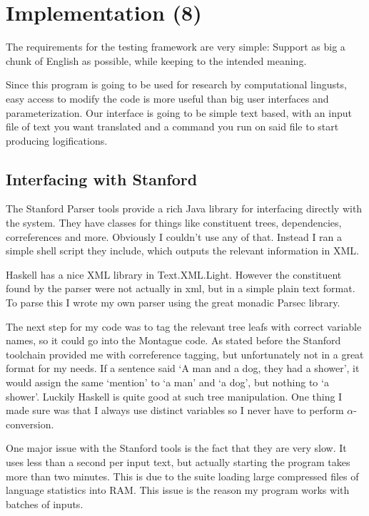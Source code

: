 \documentclass[12pt]{article}
\let\stdsection\section
\renewcommand\section{\newpage\stdsection}
\begin{document}
\section{Implementation (8)}

The requirements for the testing framework are very simple: Support as big a chunk of English as possible, while keeping to the intended meaning.

Since this program is going to be used for research by computational lingusts, easy access to modify the code is more useful than big user interfaces and parameterization. Our interface is going to be simple text based, with an input file of text you want translated and a command you run on said file to start producing logifications.

\subsection{Interfacing with Stanford}

The Stanford Parser tools provide a rich Java library for interfacing directly with the system. They have classes for things like constituent trees, dependencies, correferences and more. Obviously I couldn't use any of that. Instead I ran a simple shell script they include, which outputs the relevant information in XML.

Haskell has a nice XML library in Text.XML.Light. However the constituent found by the parser were not actually in xml, but in a simple plain text format. To parse this I wrote my own parser using the great monadic Parsec library.

The next step for my code was to tag the relevant tree leafs with correct variable names, so it could go into the Montague code. As stated before the Stanford toolchain provided me with correference tagging, but unfortunately not in a great format for my needs. If a sentence said `A man and a dog, they had a shower', it would assign the same `mention' to `a man' and `a dog', but nothing to `a shower'. Luckily Haskell is quite good at such tree manipulation. One thing I made sure was that I always use distinct variables so I never have to perform $\alpha$-conversion.

One major issue with the Stanford tools is the fact that they are very slow. It uses less than a second per input text, but actually starting the program takes more than two minutes. This is due to the suite loading large compressed files of language statistics into RAM. This issue is the reason my program works with batches of inputs.
\end{document}
